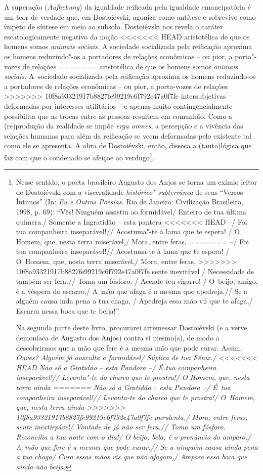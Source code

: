 {A superação (\emph{Aufhebung}) da igualdade reificada pela igualdade
emancipatória é um teor de verdade que, em Dostoiévski, agoniza como
antítese e sobrevive como ímpeto de síntese em meio ao subsolo.
Dostoiévski nos revela o caráter escatologicamente negativo da noção
<<<<<<< HEAD
aristotélica de que os homens somos \emph{animais sociais.} A sociedade
socializada pela reificação aproxima os homens reduzindo"-os a portadores
de relações econômicas -- ou pior, a porta"-vozes de relações
=======
aristotélica de que os homens somos \emph{animais sociais.} A~sociedade
socializada pela reificação aproxima os homens reduzindo-os a portadores
de relações econômicas -- ou pior, a porta-vozes de relações
>>>>>>> 10f8a93321917b8827fe99219c6f792e47a0f7fe
intersubjetivas deformadas por interesses utilitários -- e apenas muito
contingencialmente possibilita que as trocas entre as pessoas resultem
em comunhão. Como a (re)produção da realidade se impõe \emph{erga
omnes}, a percepção e a vivência das relações humanas para além da
reificação se veem deformadas pelo existente tal como ele se apresenta.
A obra de Dostoiévski, então, disseca a (tauto)lógica que faz com que o
condenado se afeiçoe ao verdugo\footnote{Nesse sentido, o poeta
  brasileiro Augusto dos Anjos se torna um exímio leitor de Dostoiévski
  com a visceralidade \emph{histórico"-subterrânea} de seus ``Versos
  Íntimos'' (In: \emph{Eu e Outras Poesias.} Rio de Janeiro: Civilização
  Brasileiro, 1998, p. 69): ``Vês! Ninguém assistiu ao formidável/
  Enterro de tua última quimera./ Somente a Ingratidão -- esta pantera
<<<<<<< HEAD
  --/ Foi tua companheira inseparável!// Acostuma"-te à lama que te
  espera! / O Homem, que, nesta terra miserável,/ Mora, entre feras,
=======
  --/ Foi tua companheira inseparável!// Acostuma-te à lama que te
  espera! / O~Homem, que, nesta terra miserável,/ Mora, entre feras,
>>>>>>> 10f8a93321917b8827fe99219c6f792e47a0f7fe
  sente inevitável / Necessidade de também ser fera.// Toma um fósforo.
  / Acende teu cigarro! / O~beijo, amigo, é a véspera do escarro,/ A~mão
  que afaga é a mesma que apedreja.// Se a alguém causa inda pena a tua
  chaga, / Apedreja essa mão vil que te afaga,/ Escarra nessa boca que
  te beija!''

  Na segunda parte deste livro, procurarei arremessar Dostoiévski (e a
  verve demoníaca de Augusto dos Anjos) contra si mesmo(s), de modo a
  descobrirmos que a mão que fere é a mesma mão que pode curar. Assim,
  \emph{Ouves? Alguém já ausculta a formidável/ Súplica de tua Fênix./
<<<<<<< HEAD
  Não só a Gratidão -- esta Pandora --/ É tua companheira inseparável!//
  Levanta"-te do charco que te prostra!/ O Homem, que, nesta terra ainda
=======
  Não só a Gratidão -- esta Pandora --/ É~tua companheira inseparável!//
  Levanta-te do charco que te prostra!/ O~Homem, que, nesta terra ainda
>>>>>>> 10f8a93321917b8827fe99219c6f792e47a0f7fe
  purulenta,/ Mora, entre feras, sente inextirpável/ Vontade de já não
  ser fera.// Toma um fósforo. Reconcilia a tua noite com o dia!/ O
  beijo, bela, é o prenúncio do amparo,/ A~mão que fere é a mesma que
  pode curar.// Se a ninguém causa ainda pena a tua chaga/ Cura essas
  mãos vis que não afagam,/ Ampara essa boca que ainda não beija. }}.

}
